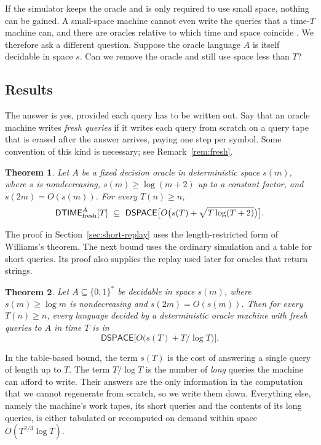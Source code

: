 \documentclass[11pt]{article}
\newtheorem{theorem}{Theorem}[section]
\theoremstyle{remark}
\newcommand{\DTIME}{\mathsf{DTIME}}
\newcommand{\DSPACE}{\mathsf{DSPACE}}
\begin{document}
If the simulator keeps the oracle and is only required to use small
space, nothing can be gained. A small-space machine cannot even write
the queries that a time-$T$ machine can, and there are oracles relative
to which time and space coincide \cite{HCCRR,CW04}. We therefore ask a
different question. Suppose the oracle language $A$ is itself decidable
in space $s$. Can we remove the oracle and still use space less than
$T$?

\subsection{Results}
The answer is yes, provided each query has to be written out. Say that
an oracle machine writes \emph{fresh queries} if it writes each query
from scratch on a query tape that is erased after the answer arrives,
paying one step per symbol. Some convention of this kind is necessary;
see Remark~\ref{rem:fresh}.

\begin{theorem}\label{thm:short-replay}
Let $A$ be a fixed decision oracle in deterministic space $s(m)$,
where $s$ is nondecreasing, $s(m)\ge\log(m+2)$ up to a constant
factor, and $s(2m)=O(s(m))$. For every $T(n)\ge n$,
\[
 \DTIME_{\rm fresh}^{A}[T]\ \subseteq\
 \DSPACE\bigl[O\bigl(s(T)+\sqrt{T\log(T+2)}\bigr)\bigr].
\]
\end{theorem}
The proof in Section~\ref{sec:short-replay} uses the length-restricted
form of Williams's theorem. The next bound uses the ordinary simulation
and a table for short queries. Its proof also supplies the replay
used later for oracles that return strings.

\begin{theorem}\label{thm:main}
Let $A\subseteq\{0,1\}^*$ be decidable in space $s(m)$, where
$s(m)\ge\log m$ is nondecreasing and $s(2m)=O(s(m))$. Then for every
$T(n)\ge n$, every language decided by a deterministic oracle machine
with fresh queries to $A$ in time $T$ is in
\[
\DSPACE\bigl[O\bigl(s(T)+T/\log T\bigr)\bigr].
\]
\end{theorem}

In the table-based bound, the term $s(T)$ is the cost
of answering a single query of length up to $T$. The term $T/\log T$ is
the number of \emph{long} queries the machine can afford to write. Their
answers are the only information in the computation that we cannot
regenerate from scratch, so we write them down. Everything else, namely
the machine's work tapes, its short queries and the contents of its long
queries, is either tabulated or recomputed on demand within space
$O(T^{2/3}\log T)$.
\end{document}
